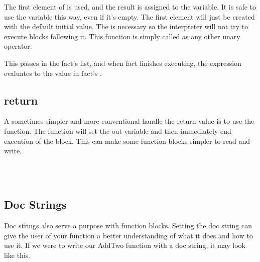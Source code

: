 The first element of  is used, and the result is assigned to the  variable.  It is safe to use the  variable this way, even if it's empty.  The first element will just be created with the default initial value.   The  is necessary so the interpreter will not try to execute blocks following it.  This function is simply called as any other unary operator.

\begin{SSCodeBox}
\scitea{;}
\end{SSCodeBox}

This passes  in the fact's  list, and when fact finishes executing, the expression evaluates to the value in fact's .

\subsection{return}

A sometimes simpler and more conventional handle the return value is to use the  function.  The  function will set the out variable and then immediately end execution of the block.  This can make some function blocks simpler to read and write.

\begin{SSCodeBox}
\scitea{\{} \\
\scitea{\hspace*{4em}}
\scitea{ in[}
\scitea{] + }
\scitea{;} \\
\scitea{\}}
\end{SSCodeBox}

\subsection{Doc Strings}

Doc strings also serve a purpose with function blocks.  Setting the doc string can give the user of your function a better understanding of what it does and how to use it.  If we were to write our AddTwo function with a doc string, it may look like this.

\begin{SSCodeBox}
\scitea{\{} \\
\scitea{} \\
\scitea{\hspace*{4em}}
\scitea{ in[}
\scitea{] + }
\scitea{;} \\
\scitea{\}}
\end{SSCodeBox}

